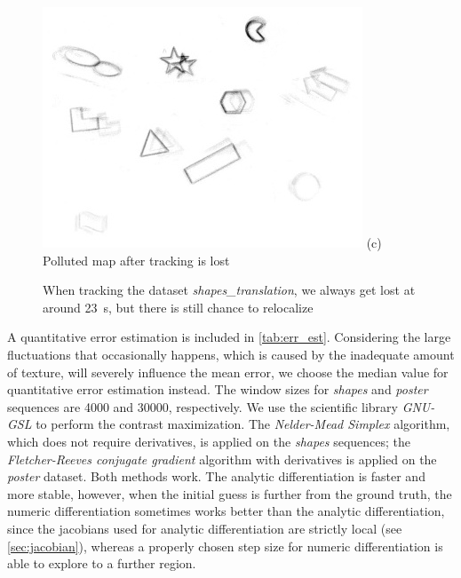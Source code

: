 \begin{enumerate}
\begin{figure}[h]
\begin{minipage}[t]{0.48\textwidth}
        \includegraphics[width = \textwidth]{images/map_956.jpg} (c)
        Polluted map after tracking is lost
      \end{minipage} \caption{When tracking the dataset
        \textit{shapes\_translation}, we always get lost at around
        \SI{23}{\second}, but there is still chance to relocalize}
      \label{fig:shapes_tr_lost}
    \end{figure}

  \end{enumerate}

  A quantitative error estimation is included in
  \cref{tab:err_est}. Considering the large fluctuations that
  occasionally happens, which is caused by the inadequate amount of
  texture, will severely influence the mean error, we choose the
  median value for quantitative error estimation instead. The window
  sizes for \textit{shapes} and \textit{poster} sequences are 4000 and
  30000, respectively. We use the scientific library \emph{GNU-GSL} to
  perform the contrast maximization. The \emph{Nelder-Mead Simplex}
  algorithm, which does not require derivatives, is applied on the
  \textit{shapes} sequences; the \textit{Fletcher-Reeves conjugate
    gradient}\citep{fletcher2013practical} algorithm with derivatives
  is applied on the \textit{poster} dataset. Both methods work. The
  analytic differentiation is faster and more stable, however, when
  the initial guess is further from the ground truth, the numeric
  differentiation sometimes works better than the analytic
  differentiation, since the jacobians used for analytic
  differentiation are strictly local (see \cref{sec:jacobian}),
  whereas a properly chosen step size for numeric differentiation is
  able to explore to a further region.

